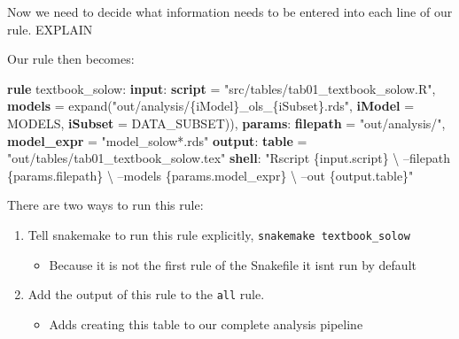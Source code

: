 \documentclass[]{book}
\newenvironment{Shaded}{\begin{snugshade}}{\end{snugshade}}
\newcommand{\KeywordTok}[1]{\textcolor[rgb]{0.13,0.29,0.53}{\textbf{{#1}}}}
\newcommand{\StringTok}[1]{\textcolor[rgb]{0.31,0.60,0.02}{{#1}}}
\newcommand{\NormalTok}[1]{{#1}}
\providecommand{\tightlist}{%
  \setlength{\itemsep}{0pt}\setlength{\parskip}{0pt}}
\theoremstyle{definition}
\theoremstyle{definition}
\theoremstyle{definition}
\theoremstyle{remark}
\begin{document}
Now we need to decide what information needs to be entered into each
line of our rule. EXPLAIN

Our rule then becomes:

\begin{Shaded}
\begin{Highlighting}[]
\KeywordTok{rule} \NormalTok{textbook_solow:}
    \KeywordTok{input}\NormalTok{:}
        \KeywordTok{script} \NormalTok{= }\StringTok{"src/tables/tab01_textbook_solow.R"}\NormalTok{,}
        \KeywordTok{models} \NormalTok{= expand(}\StringTok{"out/analysis/\{iModel\}_ols_\{iSubset\}.rds"}\NormalTok{,}
                            \KeywordTok{iModel} \NormalTok{= MODELS,}
                            \KeywordTok{iSubset} \NormalTok{= DATA_SUBSET)),}
    \KeywordTok{params}\NormalTok{:}
        \KeywordTok{filepath}   \NormalTok{= }\StringTok{"out/analysis/"}\NormalTok{,}
        \KeywordTok{model_expr} \NormalTok{= }\StringTok{"model_solow*.rds"}
    \KeywordTok{output}\NormalTok{:}
        \KeywordTok{table} \NormalTok{= }\StringTok{"out/tables/tab01_textbook_solow.tex"}
    \KeywordTok{shell}\NormalTok{:}
        \StringTok{"Rscript \{input.script\} \textbackslash{}}
\StringTok{            --filepath \{params.filepath\} \textbackslash{}}
\StringTok{            --models \{params.model_expr\} \textbackslash{}}
\StringTok{            --out \{output.table\}"}
\end{Highlighting}
\end{Shaded}

There are two ways to run this rule:

\begin{enumerate}
\def\labelenumi{\arabic{enumi}.}
\tightlist
\item
  Tell snakemake to run this rule explicitly,
  \texttt{snakemake\ textbook\_solow}

  \begin{itemize}
  \tightlist
  \item
    Because it is not the first rule of the Snakefile it isnt run by
    default
  \end{itemize}
\item
  Add the output of this rule to the \texttt{all} rule.

  \begin{itemize}
  \tightlist
  \item
    Adds creating this table to our complete analysis pipeline
  \end{itemize}
\end{enumerate}
\end{document}
